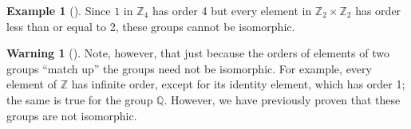 \documentclass[10pt,]{book}
\theoremstyle{plain}
\theoremstyle{definition}
\theoremstyle{definition}
\newtheorem{warning}[theorem]{Warning}
\theoremstyle{definition}
\newtheorem{example}[theorem]{Example}
\theoremstyle{definition}
\numberwithin{equation}{section}
\def\Z{\mathbb{Z}}
\def\Q{\mathbb{Q}}
\begin{document}
\begin{example}[]\label{example-46}
Since \(1\) in \(\Z_4\) has order 4 but every element in \(\Z_2 \times \Z_2\) has order less than or equal to 2, these groups cannot be isomorphic.%
\end{example}
\begin{warning}[]\label{warning-15}
Note, however, that just because the orders of elements of two groups ``match up'' the groups need not be isomorphic. For example, every element of \(\Z\) has infinite order, except for its identity element, which has order 1; the same is true for the group \(\Q\). However, we have previously proven that these groups are not isomorphic.%
\end{warning}
\typeout{************************************************}
\typeout{************************************************}
\end{document}
